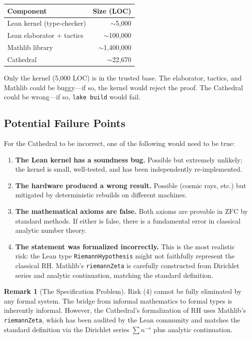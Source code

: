 \documentclass[11pt,a4paper]{article}
\theoremstyle{plain}
\theoremstyle{definition}
\newtheorem{remark}[theorem]{Remark}
\newcommand{\lean}[1]{\texttt{#1}}
\newcommand{\RH}{\ensuremath{\mathrm{RH}}}
\newcommand{\ZFC}{\mathrm{ZFC}}
\begin{document}
\begin{center}
\begin{tabular}{@{}lr@{}}
\toprule
\textbf{Component} & \textbf{Size (LOC)} \\
\midrule
Lean kernel (type-checker) & $\sim$5{,}000 \\
Lean elaborator + tactics & $\sim$100{,}000 \\
Mathlib library & $\sim$1{,}400{,}000 \\
Cathedral & $\sim$22{,}670 \\
\bottomrule
\end{tabular}
\end{center}

Only the kernel (5{,}000 LOC) is in the trusted base. The elaborator,
tactics, and Mathlib could be buggy---if so, the kernel would reject
the proof. The Cathedral could be wrong---if so, \lean{lake build}
would fail.

\subsection{Potential Failure Points}

For the Cathedral to be incorrect, one of the following would need
to be true:

\begin{enumerate}
  \item \textbf{The Lean kernel has a soundness bug.} Possible but
    extremely unlikely; the kernel is small, well-tested, and has
    been independently re-implemented.
  \item \textbf{The hardware produced a wrong result.} Possible
    (cosmic rays, etc.) but mitigated by deterministic rebuilds on
    different machines.
  \item \textbf{The mathematical axioms are false.} Both axioms are
    provable in $\ZFC$ by standard methods. If either is false,
    there is a fundamental error in classical analytic number theory.
  \item \textbf{The statement was formalized incorrectly.} This is the
    most realistic risk: the Lean type \lean{RiemannHypothesis} might
    not faithfully represent the classical \RH. Mathlib's
    \lean{riemannZeta} is carefully constructed from Dirichlet series
    and analytic continuation, matching the standard definition.
\end{enumerate}

\begin{remark}[The Specification Problem]
Risk (4) cannot be fully eliminated by any formal system. The bridge
from informal mathematics to formal types is inherently informal.
However, the Cathedral's formalization of \RH{} uses Mathlib's
\lean{riemannZeta}, which has been audited by the Lean community
and matches the standard definition via the Dirichlet series
$\sum n^{-s}$ plus analytic continuation.
\end{remark}
\end{document}
